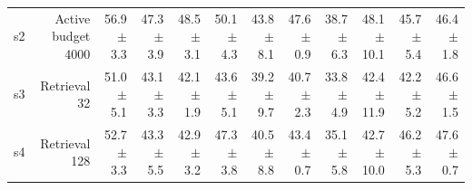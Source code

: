 \documentclass{article}
\begin{document}
\begin{table}[htbp]
\begin{tabular}{lrrrrrrrrrrr}
    s2 & Active budget 4000 & 56.9 $\pm$ 3.3 & 47.3 $\pm$ 3.9 & 48.5 $\pm$ 3.1 & 50.1 $\pm$ 4.3 & 43.8 $\pm$ 8.1 & 47.6 $\pm$ 0.9 & 38.7 $\pm$ 6.3 & 48.1 $\pm$ 10.1 & 45.7 $\pm$ 5.4 & 46.4 $\pm$ 1.8 \\
    s3 & Retrieval 32 & 51.0 $\pm$ 5.1 & 43.1 $\pm$ 3.3 & 42.1 $\pm$ 1.9 & 43.6 $\pm$ 5.1 & 39.2 $\pm$ 9.7 & 40.7 $\pm$ 2.3 & 33.8 $\pm$ 4.9 & 42.4 $\pm$ 11.9 & 42.2 $\pm$ 5.2 & 46.6 $\pm$ 1.5 \\
    s4 & Retrieval 128 & 52.7 $\pm$ 3.3 & 43.3 $\pm$ 5.5 & 42.9 $\pm$ 3.2 & 47.3 $\pm$ 3.8 & 40.5 $\pm$ 8.8 & 43.4 $\pm$ 0.7 & 35.1 $\pm$ 5.8 & 42.7 $\pm$ 10.0 & 46.2 $\pm$ 5.3 & 47.6 $\pm$ 0.7 \\
    \bottomrule
  \end{tabular}
\end{table}
\end{document}
